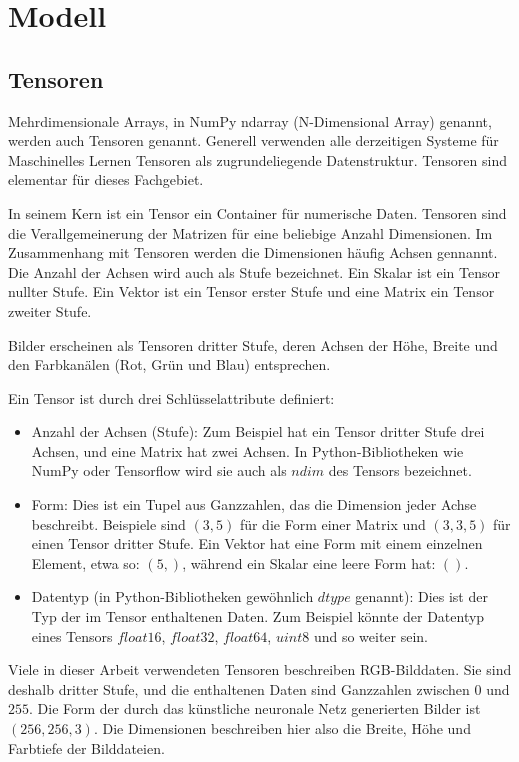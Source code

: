 \chapter{Modell}
\label{ch:model}

\section{Tensoren}
Mehrdimensionale Arrays, in NumPy ndarray (N-Dimensional Array) genannt, werden auch Tensoren genannt. Generell verwenden alle derzeitigen Systeme für Maschinelles Lernen Tensoren als zugrundeliegende Datenstruktur. Tensoren sind elementar für dieses Fachgebiet. \cite{chollet2021deep}

In seinem Kern ist ein Tensor ein Container für numerische Daten. Tensoren sind die Verallgemeinerung der Matrizen für eine beliebige Anzahl Dimensionen. Im Zusammenhang mit Tensoren werden die Dimensionen häufig Achsen gennannt. Die Anzahl der Achsen wird auch als Stufe bezeichnet. Ein Skalar ist ein Tensor nullter Stufe. Ein Vektor ist ein Tensor erster Stufe und eine Matrix ein Tensor zweiter Stufe. \cite{chollet2021deep}

Bilder erscheinen als Tensoren dritter Stufe, deren Achsen der Höhe, Breite und den Farbkanälen (Rot, Grün und Blau) entsprechen. \cite{zhang2020dive}

Ein Tensor ist durch drei Schlüsselattribute definiert:
\begin{itemize}
\item Anzahl der Achsen (Stufe): Zum Beispiel hat ein Tensor dritter Stufe drei Achsen, und eine Matrix hat zwei Achsen. In Python-Bibliotheken wie NumPy oder Tensorflow wird sie auch als $ndim$ des Tensors bezeichnet.
\item Form: Dies ist ein Tupel aus Ganzzahlen, das die Dimension jeder Achse beschreibt. Beispiele sind $(3, 5)$ für die Form einer Matrix und $(3, 3, 5)$ für einen Tensor dritter Stufe. Ein Vektor hat eine Form mit einem einzelnen Element, etwa so: $(5,)$, während ein Skalar eine leere Form hat: $()$.
\item Datentyp (in Python-Bibliotheken gewöhnlich $dtype$ genannt): Dies ist der Typ der im Tensor enthaltenen Daten. Zum Beispiel könnte der Datentyp eines Tensors $float16$, $float32$, $float64$, $uint8$ und so weiter sein.
\end{itemize}
\cite{chollet2021deep}

Viele in dieser Arbeit verwendeten Tensoren beschreiben RGB-Bilddaten. Sie sind deshalb dritter Stufe, und die enthaltenen Daten sind Ganzzahlen zwischen $0$ und $255$. Die Form der durch das künstliche neuronale Netz generierten Bilder ist $(256, 256, 3)$. Die Dimensionen beschreiben hier also die Breite, Höhe und Farbtiefe der Bilddateien.

